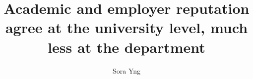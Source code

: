 \providecommand{\ci}[2]{$[#1,\allowbreak\,#2]$}

\title{Academic and employer reputation agree at the university level, much less at the department}
\author{Sora Yng}
\date{}
\maketitle


